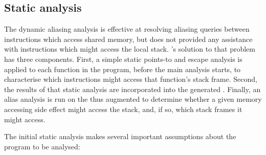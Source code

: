 
\subsection{Static analysis}



The dynamic aliasing analysis is effective at resolving aliasing
queries between instructions which access shared memory, but does not
provided any assistance with instructions which might access the local
stack.  {\Technique}'s solution to that problem has three components.
First, a simple static points-to and escape analysis is applied to
each function in the program, before the main analysis starts, to
characterise which instructions might access that function's stack
frame.  Second, the results of that static analysis are incorporated
into the generated {\StateMachines}.  Finally, an alias analysis is
run on the thus augmented {\StateMachines} to determine whether a
given memory accessing side effect might access the stack, and, if so,
which stack frames it might access.

The initial static analysis makes several important assumptions about
the program to be analysed:

